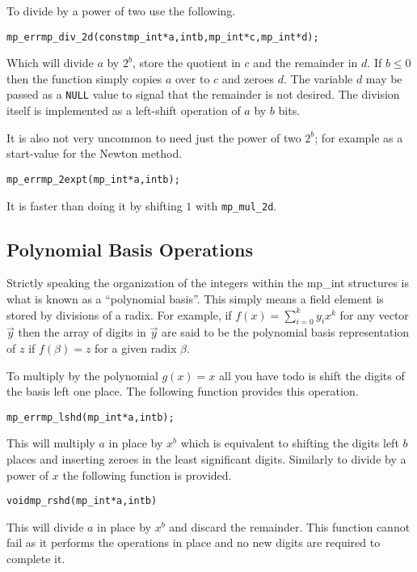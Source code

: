 \documentclass[synpaper]{book}
\begin{document}
To divide by a power of two use the following.

\begin{alltt}
mp_err mp_div_2d (const mp_int *a, int b, mp_int *c, mp_int *d);
\end{alltt}
Which will divide $a$ by $2^b$, store the quotient in $c$ and the remainder in $d$.  If $b \le 0$ then the
function simply copies $a$ over to $c$ and zeroes $d$.  The variable $d$ may be passed as a \texttt{NULL}
value to signal that the remainder is not desired.  The division itself is implemented as a left-shift
operation of $a$ by $b$ bits.

It is also not very uncommon to need just the power of two $2^b$;  for example as a start-value for the Newton method.

\begin{alltt}
mp_err mp_2expt(mp_int *a, int b);
\end{alltt}
It is faster than doing it by shifting $1$ with \texttt{mp\_mul\_2d}.

\subsection{Polynomial Basis Operations}

Strictly speaking the organization of the integers within the mp\_int structures is what is known as a
``polynomial basis''.  This simply means a field element is stored by divisions of a radix.  For example, if
$f(x) = \sum_{i=0}^{k} y_ix^k$ for any vector $\vec y$ then the array of digits in $\vec y$ are said to be
the polynomial basis representation of $z$ if $f(\beta) = z$ for a given radix $\beta$.

To multiply by the polynomial $g(x) = x$ all you have todo is shift the digits of the basis left one place.  The
following function provides this operation.

\begin{alltt}
mp_err mp_lshd (mp_int *a, int b);
\end{alltt}

This will multiply $a$ in place by $x^b$ which is equivalent to shifting the digits left $b$ places and inserting zeroes
in the least significant digits.  Similarly to divide by a power of $x$ the following function is provided.

\begin{alltt}
void mp_rshd (mp_int *a, int b)
\end{alltt}
This will divide $a$ in place by $x^b$ and discard the remainder.  This function cannot fail as it performs the operations
in place and no new digits are required to complete it.
\end{document}
